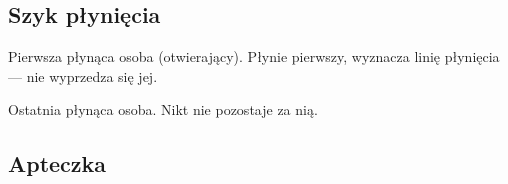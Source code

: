 \subsection{Szyk płynięcia}

\begin{description}[leftmargin=1.5em, font=\bfseries]
  \item[Zielona Latarnia]
    Pierwsza płynąca osoba (otwierający). Płynie pierwszy, wyznacza linię płynięcia —
    nie wyprzedza się jej.
  \item[Czerwona Latarnia]
    Ostatnia płynąca osoba. Nikt nie pozostaje za nią.
\end{description}

\subsection{Apteczka}

